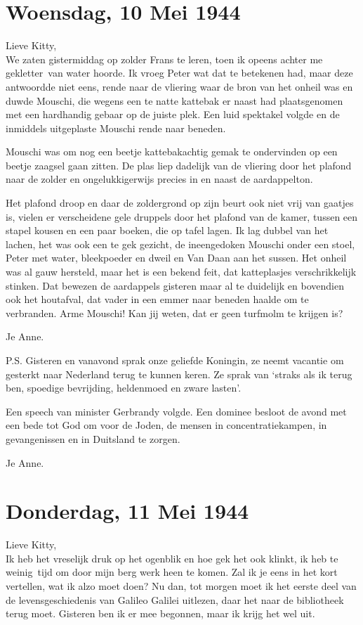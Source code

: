 \documentclass{book}
\begin{document}
\chapter{Woensdag, 10 Mei 1944}

Lieve Kitty,\\We zaten gistermiddag op zolder Frans te leren, toen ik
opeens achter me gekletter~van water hoorde. Ik vroeg Peter wat dat te
betekenen had, maar deze antwoordde niet eens, rende naar de vliering
waar de bron van het onheil was en duwde Mouschi, die wegens een te
natte kattebak er naast had plaatsgenomen met een hardhandig gebaar op
de juiste plek. Een luid spektakel volgde en de inmiddels uitgeplaste
Mouschi rende naar beneden.

Mouschi was om nog een beetje kattebakachtig gemak te ondervinden op een
beetje zaagsel gaan zitten. De plas liep dadelijk van de vliering door
het plafond naar de zolder en ongelukkigerwijs precies in en naast de
aardappelton.

Het plafond droop en daar de zoldergrond op zijn beurt ook niet vrij van
gaatjes is, vielen er verscheidene gele druppels door het plafond van de
kamer, tussen een stapel kousen en een paar boeken, die op tafel lagen.
Ik lag dubbel van het lachen, het was ook een te gek gezicht, de
ineengedoken Mouschi onder een stoel, Peter met water, bleekpoeder en
dweil en Van Daan aan het sussen. Het onheil was al gauw hersteld, maar
het is een bekend feit, dat katteplasjes verschrikkelijk stinken. Dat
bewezen de aardappels gisteren maar al te duidelijk en bovendien ook het
houtafval, dat vader in een emmer naar beneden haalde om te verbranden.
Arme Mouschi! Kan jij weten, dat er geen turfmolm te krijgen is?

Je Anne.

P.S. Gisteren en vanavond sprak onze geliefde Koningin, ze neemt
vacantie om gesterkt naar Nederland terug te kunnen keren. Ze sprak van
`straks als ik terug ben, spoedige bevrijding, heldenmoed en zware
lasten'.

Een speech van minister Gerbrandy volgde. Een dominee besloot de avond
met een bede tot God om voor de Joden, de mensen in concentratiekampen,
in gevangenissen en in Duitsland te zorgen.

Je Anne.

\chapter{Donderdag, 11 Mei 1944}

Lieve Kitty,\\Ik heb het vreselijk druk op het ogenblik en hoe gek het
ook klinkt, ik heb te weinig~tijd om door mijn berg werk heen te komen.
Zal ik je eens in het kort vertellen, wat ik alzo moet doen? Nu dan, tot
morgen moet ik het eerste deel van de levensgeschiedenis van Galileo
Galilei uitlezen, daar het naar de bibliotheek terug moet. Gisteren ben
ik er mee begonnen, maar ik krijg het wel uit.
\end{document}
